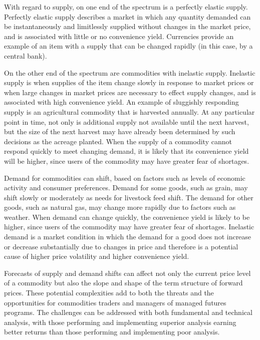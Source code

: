 \documentclass[11pt]{article}
\begin{document}
With regard to supply, on one end of the spectrum is a perfectly elastic supply. Perfectly elastic supply describes a market in which any quantity demanded can be instantaneously and limitlessly supplied without changes in the market price, and is associated with little or no convenience yield. Currencies provide an example of an item with a supply that can be changed rapidly (in this case, by a central bank).

On the other end of the spectrum are commodities with inelastic supply. Inelastic supply is when supplies of the item change slowly in response to market prices or when large changes in market prices are necessary to effect supply changes, and is associated with high convenience yield. An example of sluggishly responding supply is an agricultural commodity that is harvested annually. At any particular point in time, not only is additional supply not available until the next harvest, but the size of the next harvest may have already been determined by such decisions as the acreage planted. When the supply of a commodity cannot respond quickly to meet changing demand, it is likely that its convenience yield will be higher, since users of the commodity may have greater fear of shortages.

Demand for commodities can shift, based on factors such as levels of economic activity and consumer preferences. Demand for some goods, such as grain, may shift slowly or moderately as needs for livestock feed shift. The demand for other goods, such as natural gas, may change more rapidly due to factors such as weather. When demand can change quickly, the convenience yield is likely to be higher, since users of the commodity may have greater fear of shortages. Inelastic demand is a market condition in which the demand for a good does not increase or decrease substantially due to changes in price and therefore is a potential cause of higher price volatility and higher convenience yield.

Forecasts of supply and demand shifts can affect not only the current price level of a commodity but also the slope and shape of the term structure of forward prices. These potential complexities add to both the threats and the opportunities for commodities traders and managers of managed futures programs. The challenges can be addressed with both fundamental and technical analysis, with those performing and implementing superior analysis earning better returns than those performing and implementing poor analysis.
\end{document}
